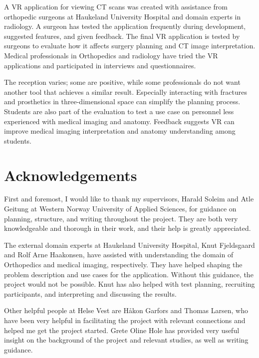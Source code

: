 \documentclass[a4paper]{report}
\begin{document}
A VR application for viewing CT scans was created with assistance from orthopedic surgeons at Haukeland University Hospital and domain experts in radiology. A surgeon has tested the application frequently during development, suggested features, and given feedback.
The final VR application is tested by surgeons to evaluate how it affects surgery planning and CT image interpretation.
Medical professionals in Orthopedics and radiology have tried the VR applications and participated in interviews and questionnaires.

The reception varies; some are positive, while some professionals do not want another tool that achieves a similar result. Especially interacting with fractures and prosthetics in three-dimensional space can simplify the planning process.
Students are also part of the evaluation to test a use case on personnel less experienced with medical imaging and anatomy. Feedback suggests VR can improve medical imaging interpretation and anatomy understanding among students.

\pagebreak
\section*{Acknowledgements}
First and foremost, I would like to thank my supervisors, Harald Soleim and Atle Geitung at Western Norway University of Applied Sciences, for guidance on planning, structure, and writing throughout the project. They are both very knowledgeable and thorough in their work, and their help is greatly appreciated.

The external domain experts at Haukeland University Hospital, Knut Fjeldsgaard and Rolf Arne Haakonsen, have assisted with understanding the domain of Orthopedics and medical imaging, respectively. They have helped shaping the problem description and use cases for the application. Without this guidance, the project would not be possible. Knut has also helped with test planning, recruiting participants, and interpreting and discussing the results.

Other helpful people at Helse Vest are Håkon Garfors and Thomas Larsen, who have been very helpful in facilitating the project with relevant connections and helped me get the project started. Grete Oline Hole has provided very useful insight on the background of the project and relevant studies, as well as writing guidance.

\pagebreak
\tableofcontents
\listoffigures

\end{document}
